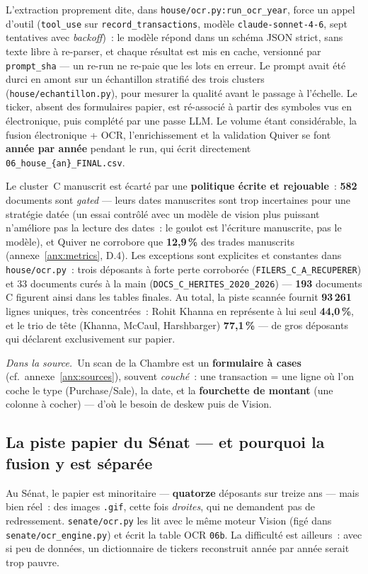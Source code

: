 \documentclass[11pt,a4paper]{article}
\newcommand{\co}[1]{\texttt{\small #1}}
\newcommand{\srcex}[1]{\par\smallskip\noindent{\color{black!55}\rule{2pt}{\baselineskip}}\hspace{6pt}\begin{minipage}{\dimexpr\linewidth-16pt}\small\textit{Dans la source.}\ #1\end{minipage}\par\smallskip}
\begin{document}
L'extraction proprement dite, dans \co{house/ocr.py:run_ocr_year}, force un appel d'outil (\co{tool_use} sur
\co{record_transactions}, modèle \co{claude-sonnet-4-6}, sept tentatives avec \emph{backoff})~: le modèle
répond dans un schéma JSON strict, sans texte libre à re-parser, et chaque résultat est mis en cache,
versionné par \co{prompt_sha} — un re-run ne re-paie que les lots en erreur. Le prompt avait été durci en
amont sur un échantillon stratifié des trois clusters (\co{house/echantillon.py}), pour mesurer la qualité
avant le passage à l'échelle. Le ticker, absent des formulaires papier, est ré-associé à partir des symboles
vus en électronique, puis complété par une passe LLM. Le volume étant considérable, la fusion
électronique + OCR, l'enrichissement et la validation Quiver se font \textbf{année par année} pendant le run,
qui écrit directement \co{06_house_\{an\}_FINAL.csv}.

Le cluster~C manuscrit est écarté par une \textbf{politique écrite et rejouable}~: \textbf{582} documents
sont \emph{gated} — leurs dates manuscrites sont trop incertaines pour une stratégie datée (un essai contrôlé avec un modèle de vision plus puissant n'améliore pas la lecture des dates~: le goulot est l'écriture manuscrite, pas le modèle), et Quiver ne corrobore que
\textbf{12,9\,\%} des trades manuscrits (annexe~\ref{anx:metrics}, D.4). Les exceptions sont explicites et
constantes dans \co{house/ocr.py}~: trois déposants à forte perte corroborée (\co{FILERS_C_A_RECUPERER}) et
33 documents curés à la main (\co{DOCS_C_HERITES_2020_2026}) — \textbf{193} documents C figurent ainsi dans
les tables finales. Au total, la piste scannée fournit \textbf{93\,261} lignes uniques, très concentrées~:
Rohit Khanna en représente à lui seul \textbf{44,0\,\%}, et le trio de tête (Khanna, McCaul, Harshbarger)
\textbf{77,1\,\%} — de gros déposants qui déclarent exclusivement sur papier.

\srcex{Un scan de la Chambre est un \textbf{formulaire à cases} (cf.~annexe~\ref{anx:sources}), souvent
\emph{couché}~: une transaction = une ligne où l'on coche le type (Purchase/Sale), la date, et la
\textbf{fourchette de montant} (une colonne à cocher) — d'où le besoin de deskew puis de Vision.}

\subsection{La piste papier du Sénat — et pourquoi la fusion y est séparée}
\label{sec:socr}
Au Sénat, le papier est minoritaire — \textbf{quatorze} déposants sur treize ans — mais bien réel~: des
images \co{.gif}, cette fois \emph{droites}, qui ne demandent pas de redressement. \co{senate/ocr.py} les
lit avec le même moteur Vision (figé dans \co{senate/ocr_engine.py}) et écrit la table OCR \co{06b}. La
difficulté est ailleurs~: avec si peu de données, un dictionnaire de tickers reconstruit année par année
serait trop pauvre.
\end{document}

